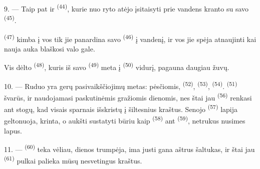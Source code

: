 9. --- Taip pat ir  \textsuperscript{(44)}, kurie nuo ryto
atėjo įsitaisyti prie vandens kranto su savo 
\textsuperscript{(45)}.

 \textsuperscript{(47)} kimba į  vos tik jie
panardina savo  \textsuperscript{(46)} į vandenį, ir vos jie spėja
atnaujinti  kai nauja auka blaškosi valo gale.

Vis dėlto  \textsuperscript{(48)}, kuris iš savo
 \textsuperscript{(49)} meta  į
 \textsuperscript{(50)} vidurį, pagauna daugiau žuvų.

10. --- Ruduo yra gerų pasivaikščiojimų metas: pėsčiomis, 
\textsuperscript{(52)},  \textsuperscript{(53)},
 \textsuperscript{(54)}.  \textsuperscript{(51)}
švarūs, ir naudojamasi paskutinėmis gražiomis dienomis, nes štai jau
 \textsuperscript{(56)} renkasi ant stogų, kad visais sparnais
išskristų į šiltesnius kraštus. Senojo  \textsuperscript{(57)}
lapija geltonuoja,  krinta, o aukšti  sustatyti
būriu kaip  \textsuperscript{(58)} ant 
\textsuperscript{(59)}, netrukus nusimes lapus.

11. ---  \textsuperscript{(60)} teka vėliau, dienos trumpėja,
 ima justi gana aštrus šaltukas, ir štai jau 
\textsuperscript{(61)} pulkai palieka mūsų nesvetingus kraštus.

\VUsaut{6.0mm}
\VUfilet{22mm}
